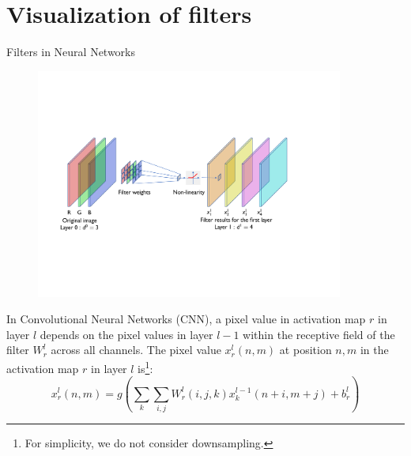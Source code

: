 \documentclass[xcolor=pdftex,dvipsnames,table]{beamer}
\begin{document}
\section{Visualization of filters}

\begin{frame}{Filters in Neural Networks}
\begin{figure}[htb]
\includegraphics[width=0.9\textwidth]{../graphics/CNN_FirstLayer.pdf}
\end{figure}
In Convolutional Neural Networks (CNN), a pixel value in activation map $r$ in layer $l$ depends on the pixel values in layer $l-1$ within the receptive field of the filter $W^{l}_r$ across all channels. The pixel value $x^{l}_{r}(n,m)$ at position $n,m$ in the activation map $r$ in layer $l$ is\footnote{For simplicity, we do not consider downsampling.}: 
\begin{equation}
	x^{l}_{r}(n,m) = g(\sum_{k}\sum_{i,j}W^{l}_r(i,j,k)x^{l-1}_{k}(n+i,m+j) + b^l_r)
\end{equation} 
\end{frame}
\end{document}
